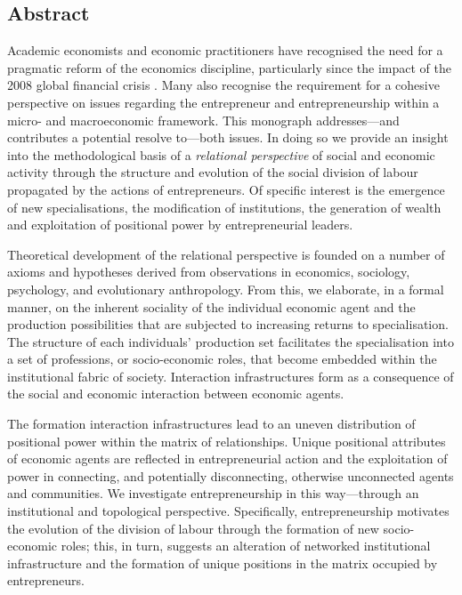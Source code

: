 \documentclass[11pt,fleqn]{book}
\begin{document}
\begin{singlespace}
\setcounter{tocdepth}{2}
\tableofcontents

\listoffigures

\chapter*{Abstract}


Academic economists and economic practitioners have recognised the need for a pragmatic reform of the economics discipline, particularly since the impact of the 2008 global financial crisis \citep{Hodgson2009}. Many also recognise the requirement for a cohesive perspective on issues regarding the entrepreneur and entrepreneurship within a micro- and macroeconomic framework. This monograph addresses---and contributes a potential resolve to---both issues. In doing so we provide an insight into the methodological basis of a \emph{relational perspective} of social and economic activity through the structure and evolution of the social division of labour propagated by the actions of entrepreneurs. Of specific interest is the emergence of new specialisations, the modification of institutions, the generation of wealth and exploitation of positional power by entrepreneurial leaders.

Theoretical development of the relational perspective is founded on a number of axioms and hypotheses derived from observations in economics, sociology, psychology, and evolutionary anthropology. From this, we elaborate, in a formal manner, on the inherent sociality of the individual economic agent and the production possibilities that are subjected to increasing returns to specialisation. The structure of each individuals' production set facilitates the specialisation into a set of professions, or socio-economic roles, that become embedded within the institutional fabric of society. Interaction infrastructures form as a consequence of the social and economic interaction between economic agents.

The formation interaction infrastructures lead to an uneven distribution of positional power within the matrix of relationships. Unique positional attributes of economic agents are reflected in entrepreneurial action and the exploitation of power in connecting, and potentially disconnecting, otherwise unconnected agents and communities. We investigate entrepreneurship in this way---through an institutional and topological perspective. Specifically, entrepreneurship motivates the evolution of the division of labour through the formation of new socio-economic roles; this, in turn, suggests an alteration of networked institutional infrastructure and the formation of unique positions in the matrix occupied by entrepreneurs.


\end{singlespace}
\end{document}
